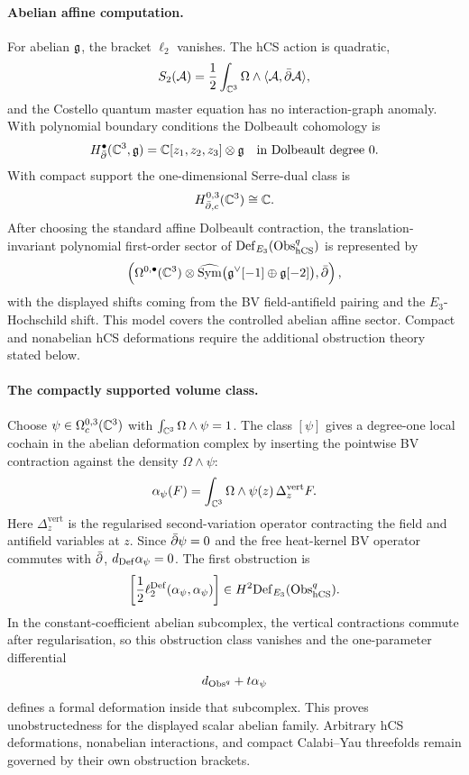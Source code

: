 \paragraph{Abelian affine computation.}
For abelian \(\mathfrak{g}\), the bracket \(\ell_2\) vanishes. The hCS action is
quadratic,
\[
  S_2(\mathcal{A})
  =
  \frac12\int_{\mathbb{C}^3}\Omega\wedge
  \langle\mathcal{A},\bar\partial\mathcal{A}\rangle,
\]
and the Costello quantum master equation has no interaction-graph
anomaly. With polynomial boundary conditions the Dolbeault cohomology is
\[
  H^\bullet_{\bar\partial}(\mathbb{C}^3,\mathfrak{g})
  =
  \mathbb{C}[z_1,z_2,z_3]\otimes\mathfrak{g}
  \quad\hbox{in Dolbeault degree }0.
\]
With compact support the one-dimensional Serre-dual class is
\[
  H^{0,3}_{\bar\partial,c}(\mathbb{C}^3)\cong\mathbb{C}.
\]
After choosing the standard affine Dolbeault contraction, the
translation-invariant polynomial first-order sector of
\(\mathrm{Def}_{E_3}(\mathrm{Obs}^q_{\mathrm{hCS}})\) is represented by
\[
  \left(
  \Omega^{0,\bullet}(\mathbb{C}^3)
  \otimes
  \widehat{\mathrm{Sym}}\bigl(\mathfrak{g}^\vee[-1]\oplus\mathfrak{g}[-2]\bigr),
  \bar\partial
  \right),
\]
with the displayed shifts coming from the BV field-antifield pairing
and the \(E_3\)-Hochschild shift. This model covers the controlled
abelian affine sector. Compact and nonabelian hCS deformations require
the additional obstruction theory stated below.

\paragraph{The compactly supported volume class.}
Choose
\(\psi\in\Omega^{0,3}_c(\mathbb{C}^3)\) with
\(\int_{\mathbb{C}^3}\Omega\wedge\psi=1\). The class \([\psi]\) gives a
degree-one local cochain in the abelian deformation complex by inserting
the pointwise BV contraction against the density \(\Omega\wedge\psi\):
\[
  \alpha_\psi(F)
  =
  \int_{\mathbb{C}^3}\Omega\wedge\psi(z)\,
  \Delta^{\mathrm{vert}}_zF .
\]
Here \(\Delta^{\mathrm{vert}}_z\) is the regularised second-variation
operator contracting the field and antifield variables at \(z\). Since
\(\bar\partial\psi=0\) and the free heat-kernel BV operator commutes with
\(\bar\partial\), \(d_{\mathrm{Def}}\alpha_\psi=0\). The first obstruction is
\[
  \left[
  \frac12\ell_2^{\mathrm{Def}}(\alpha_\psi,\alpha_\psi)
  \right]
  \in H^2\mathrm{Def}_{E_3}(\mathrm{Obs}^q_{\mathrm{hCS}}).
\]
In the constant-coefficient abelian subcomplex, the vertical
contractions commute after regularisation, so this obstruction class
vanishes and the one-parameter differential
\[
  d_{\mathrm{Obs}^q}+t\alpha_\psi
\]
defines a formal deformation inside that subcomplex. This proves
unobstructedness for the displayed scalar abelian family. Arbitrary hCS
deformations, nonabelian interactions, and compact Calabi--Yau
threefolds remain governed by their own obstruction brackets.

